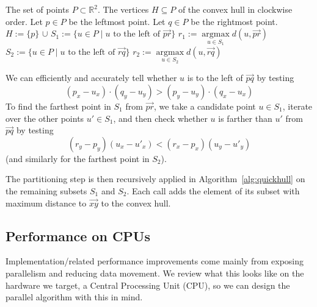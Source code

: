 \documentclass[11pt,a4paper]{article}
\DeclareMathOperator*{\argmax}{argmax}
\begin{document}
\begin{algorithm}[ht]
  \begin{algorithmic}[1]
    \Require The set of points $P \subset \mathbb{R}^2$.
    \Ensure The vertices $H \subseteq P$ of the convex hull in clockwise order.
    \State Let $p \in P$ be the leftmost point.
    \State Let $q \in P$ be the rightmost point.
    \State $H := \{p\}$ $\cup$ 
        \State {}
      \Else{}
        \State $S_1 := \{u \in P \mid u \text{ to the left of } \overrightarrow{pr}\}$
        \State $r_1 := \argmax\limits_{u \in S_1} d(u, \overrightarrow{pr})$
        \State $S_2 := \{u \in P \mid u \text{ to the left of } \overrightarrow{rq}\}$
        \State $r_2 := \argmax\limits_{u \in S_2} d(u, \overrightarrow{rq})$
        \State {}
      \EndIf
    \EndFunction
  \end{algorithmic}%
  \label{alg:quickhull}%
\end{algorithm}

We can efficiently and accurately tell whether $u$ is to the left of $\overrightarrow{pq}$ by testing
\[
(p_x - u_x) \cdot (q_y - u_y) > (p_y - u_y) \cdot (q_x - u_x)
\]
To find the farthest point in $S_1$ from $\overrightarrow{pr}$, we take a candidate point $u \in S_1$, iterate over the other points $u' \in S_1$, and then check whether $u$ is farther than $u'$ from $\overrightarrow{pq}$ by testing
\[
(r_y - p_y) (u_x - u'_x) < (r_x - p_x) (u_y - u'_y)
\]
(and similarly for the farthest point in $S_2$).

The partitioning step is then recursively applied in Algorithm~\ref{alg:quickhull} on the remaining subsets $S_1$ and $S_2$.
Each call adds the element of its subset with maximum distance to $\overrightarrow{xy}$ to the convex hull.

\subsection{Performance on CPUs}\label{sec:performance}
Implementation\-/related performance improvements come mainly from exposing parallelism and reducing data movement.
We review what this looks like on the hardware we target, a Central Processing Unit (CPU), so we can design the parallel algorithm with this in mind.
\end{document}
